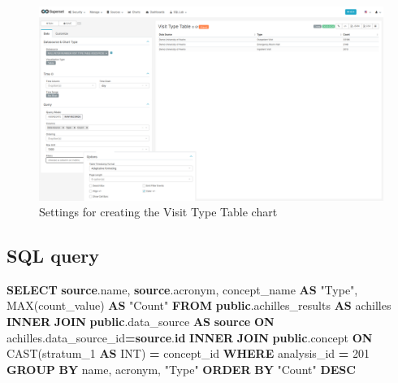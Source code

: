 \documentclass[
]{book}
\newenvironment{Shaded}{\begin{snugshade}}{\end{snugshade}}
\newcommand{\DataTypeTok}[1]{\textcolor[rgb]{0.13,0.29,0.53}{#1}}
\newcommand{\DecValTok}[1]{\textcolor[rgb]{0.00,0.00,0.81}{#1}}
\newcommand{\FunctionTok}[1]{\textcolor[rgb]{0.00,0.00,0.00}{#1}}
\newcommand{\KeywordTok}[1]{\textcolor[rgb]{0.13,0.29,0.53}{\textbf{#1}}}
\newcommand{\NormalTok}[1]{#1}
\newcommand{\OperatorTok}[1]{\textcolor[rgb]{0.81,0.36,0.00}{\textbf{#1}}}
\newcommand{\OtherTok}[1]{\textcolor[rgb]{0.56,0.35,0.01}{#1}}
\begin{document}
\begin{figure}
\includegraphics[width=1\linewidth]{images/06-visit/02-visit_types_table} \caption{Settings for creating the Visit Type Table chart}\label{fig:visitTypeTable}
\end{figure}

\hypertarget{sql-query-17}{%
\subsection{SQL query}\label{sql-query-17}}

\begin{Shaded}
\begin{Highlighting}[]
\KeywordTok{SELECT} \KeywordTok{source}\NormalTok{.name,}
       \KeywordTok{source}\NormalTok{.acronym,}
\NormalTok{       concept\_name }\KeywordTok{AS} \OtherTok{"Type"}\NormalTok{,}
       \FunctionTok{MAX}\NormalTok{(count\_value) }\KeywordTok{AS} \OtherTok{"Count"}
\KeywordTok{FROM} \KeywordTok{public}\NormalTok{.achilles\_results }\KeywordTok{AS}\NormalTok{ achilles}
\KeywordTok{INNER} \KeywordTok{JOIN} \KeywordTok{public}\NormalTok{.data\_source }\KeywordTok{AS} \KeywordTok{source} \KeywordTok{ON}\NormalTok{ achilles.data\_source\_id}\OperatorTok{=}\KeywordTok{source}\NormalTok{.}\KeywordTok{id}
\KeywordTok{INNER} \KeywordTok{JOIN} \KeywordTok{public}\NormalTok{.concept }\KeywordTok{ON} \FunctionTok{CAST}\NormalTok{(stratum\_1 }\KeywordTok{AS} \DataTypeTok{INT}\NormalTok{) }\OperatorTok{=}\NormalTok{ concept\_id}
\KeywordTok{WHERE}\NormalTok{ analysis\_id }\OperatorTok{=} \DecValTok{201}
\KeywordTok{GROUP} \KeywordTok{BY}\NormalTok{ name, acronym, }\OtherTok{"Type"}
\KeywordTok{ORDER} \KeywordTok{BY} \OtherTok{"Count"} \KeywordTok{DESC}
\end{Highlighting}
\end{Shaded}
\end{document}
